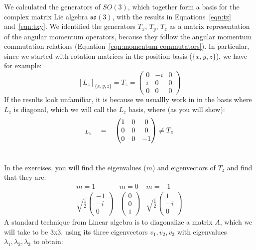 \documentclass[12pt]{article}
\begin{document}
We calculated the generators of $SO(3)$, which together form a basis
for the complex matrix Lie algebra $\mathfrak{so}(3)$, with the results in
Equations~\ref{eqn:tz} and~\ref{eqn:txy}.  We identified the
generators $T_x$, $T_y$, $T_z$ as a matrix representation of the angular
momentum operators, because they follow the angular momentum commutation
relations (Equation~\ref{eqn:momentum-commutators}).
In particular, since we started with rotation matrices in
the position basis ($\{x,y,z\}$), we have for example:
$$[L_z]_{\{x,y,z\}} = T_z = \begin{pmatrix}
  0&-i&0\\i&0&0\\0&0&0 \end{pmatrix}$$
If the results look unfamiliar, it is because we usuallly work in in
the basis where $L_z$ is diagonal, which we will call the $L_z$ basis,
where (as you will show):
\begin{align}
[L_z]_{L_z} \quad &= \quad \begin{pmatrix}1&0&0\\0&0&0\\0&0&-1\end{pmatrix} \neq T_z \\[5pt]
\notag
\end{align}
In the exercises, you will find the eigenvalues ($m$) and eigenvectors
of $T_z$ and find that they are:
\begin{equation}
\label{eqn:lz-eigenvectors}
\begin{array}{ccc}
  m=1 & m=0 & m=-1 \\[6pt]
  \sqrt{\frac{1}{2}}\begin{pmatrix}-1\\-i\\0\end{pmatrix} &
  \begin{pmatrix}0\\0\\1\end{pmatrix} &
  \sqrt{\frac{1}{2}}\begin{pmatrix}1\\-i\\0\end{pmatrix}
\end{array}
\end{equation}
A standard technique from Linear algebra is to diagonalize a matrix
$A$, which we will take to be 3x3, using  its three eigenvectors $v_1, v_2, v_3$ with eigenvalues
$\lambda_1, \lambda_2, \lambda_3$ to obtain:
\end{document}
